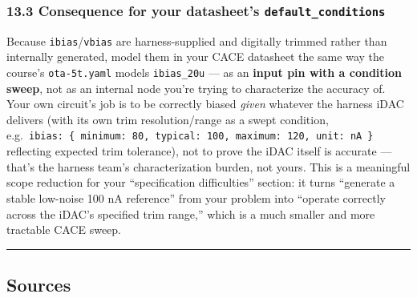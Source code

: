 \documentclass[
]{article}
\begin{document}
\hypertarget{consequence-for-your-datasheets-default_conditions}{%
\subsubsection{\texorpdfstring{13.3 Consequence for your datasheet's
\texttt{default\_conditions}}{13.3 Consequence for your datasheet's default\_conditions}}\label{consequence-for-your-datasheets-default_conditions}}

Because \texttt{ibias}/\texttt{vbias} are harness-supplied and digitally
trimmed rather than internally generated, model them in your CACE
datasheet the same way the course's \texttt{ota-5t.yaml} models
\texttt{ibias\_20u} --- as an \textbf{input pin with a condition sweep},
not as an internal node you're trying to characterize the accuracy of.
Your own circuit's job is to be correctly biased \emph{given} whatever
the harness iDAC delivers (with its own trim resolution/range as a swept
condition,
e.g.~\texttt{ibias:\ \{\ minimum:\ 80,\ typical:\ 100,\ maximum:\ 120,\ unit:\ nA\ \}}
reflecting expected trim tolerance), not to prove the iDAC itself is
accurate --- that's the harness team's characterization burden, not
yours. This is a meaningful scope reduction for your ``specification
difficulties'' section: it turns ``generate a stable low-noise 100 nA
reference'' from your problem into ``operate correctly across the iDAC's
specified trim range,'' which is a much smaller and more tractable CACE
sweep.

\begin{center}\rule{0.5\linewidth}{0.5pt}\end{center}

\hypertarget{sources}{%
\subsection{Sources}\label{sources}}
\end{document}

